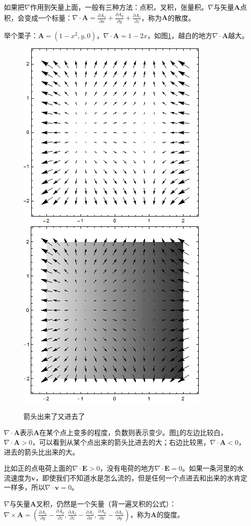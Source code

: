 如果把$\nabla$作用到矢量上面，一般有三种方法：点积，叉积，张量积。$\nabla$与矢量$\mathbf{A}$点积，会变成一个标量：$\nabla \cdot \mathbf{A}=\frac{\partial A_x}{\partial x}+\frac{\partial A_y}{\partial y}+\frac{\partial A_z}{\partial z}$，称为$\mathbf{A}$的散度。

举个栗子：$\mathbf{A}=(1-x^2,y,0)$，$\nabla \cdot \mathbf{A}=1-2x$，如图\ref{fig-vec-div}，越白的地方$\nabla \cdot \mathbf{A}$越大。
\begin{figure}[htb]
\centering
\includegraphics[width=0.33\linewidth]{fig/vec-div.png}
\includegraphics[width=0.33\linewidth]{fig/vec-div-2.png}
\caption{箭头出来了又进去了}
\label{fig-vec-div}
\end{figure}

$\nabla \cdot \mathbf{A}$表示$\mathbf{A}$在某个点上变多的程度，负数则表示变少。图\ref{fig-vec-div}的左边比较白，$\nabla \cdot \mathbf{A}>0$，可以看到从某个点出来的箭头比进去的大；右边比较黑，$\nabla \cdot \mathbf{A}<0$，进去的箭头比出来的大。

比如正的点电荷上面的$\nabla \cdot \mathbf{E}>0$，没有电荷的地方$\nabla \cdot \mathbf{E}=0$。如果一条河里的水流速度为$\mathbf{v}$，即使我们不知道水是怎么流的，但是任何一个点进去和出来的水肯定一样多，所以$\nabla \cdot \mathbf{v}=0$。

$\nabla$与矢量$\mathbf{A}$叉积，仍然是一个矢量（背一遍叉积的公式）：$\nabla \times \mathbf{A}=(\frac{\partial A_z}{\partial y}-\frac{\partial A_y}{\partial z},\frac{\partial A_x}{\partial z}-\frac{\partial A_z}{\partial x},\frac{\partial A_y}{\partial x}-\frac{\partial A_x}{\partial y})$，称为$\mathbf{A}$的旋度。

